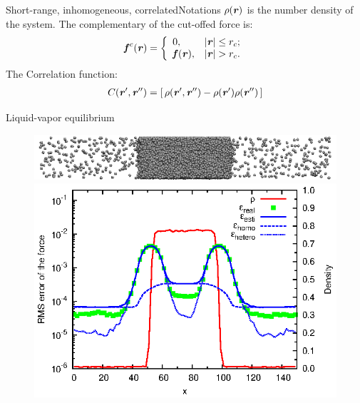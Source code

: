 \documentclass{beamer}
\newcommand{\bluec}[1]{{\color{blue} #1}}
\renewcommand{\v}[1]{\textbf{\textit{#1}}}
\begin{document}
\begin{frame}{Short-range, inhomogeneous, correlated}{Notations}
  \vfill
  \bluec{$\rho(\v r)$} is the number density of the system.
  \vfill  
  The complementary of the cut-offed force is:
  \bluec{
    \begin{align*}
      \v f^c(\v r) =
      \left\{
        \begin{array}{ll}
          0, & \vert\v r\vert\leq r_c; \\
          \v f(\v r), & \vert\v r\vert > r_c.
        \end{array}
      \right.
    \end{align*}}  
  \vfill  
  The Correlation function:
  \bluec{
    \begin{align*}
      C (\v r', \v r'') = [\,\rho(\v r', \v r'') -  \rho(\v r')\rho(\v r'')\,]
    \end{align*}}
  \vfill  
\end{frame}


\begin{frame}{Liquid-vapor equilibrium}
  \begin{figure}
    \centering
    \includegraphics[scale=1]{figs/t0.85-n16000-rc07.5uni/confout-02.eps}\\
    \includegraphics[]{figs/t0.85-n16000-rc07.5uni/error-uniform.eps}
  \end{figure}
\end{frame}
\end{document}
